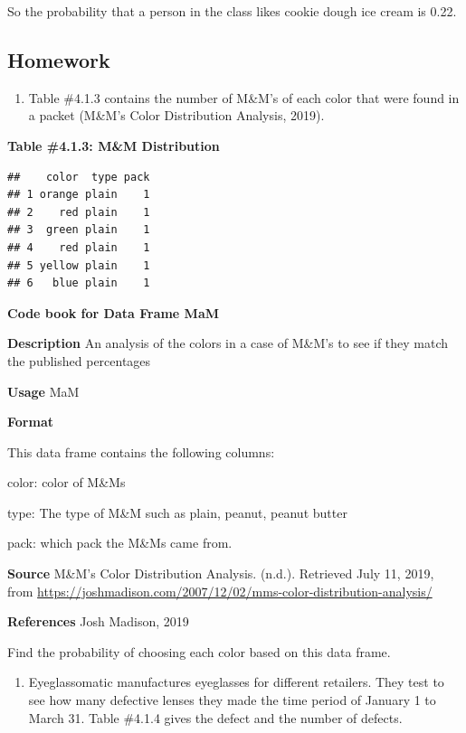 \documentclass[
]{book}
\providecommand{\tightlist}{%
  \setlength{\itemsep}{0pt}\setlength{\parskip}{0pt}}
\begin{document}
So the probability that a person in the class likes cookie dough ice cream is 0.22.

\hypertarget{homework-6}{%
\subsection{Homework}\label{homework-6}}

\begin{enumerate}
\def\labelenumi{\arabic{enumi}.}
\tightlist
\item
  Table \#4.1.3 contains the number of M\&M's of each color that were found in a packet (M\&M's Color Distribution Analysis, 2019).
\end{enumerate}

\textbf{Table \#4.1.3: M\&M Distribution}

\begin{verbatim}
##    color  type pack
## 1 orange plain    1
## 2    red plain    1
## 3  green plain    1
## 4    red plain    1
## 5 yellow plain    1
## 6   blue plain    1
\end{verbatim}

\textbf{Code book for Data Frame MaM}

\textbf{Description}
An analysis of the colors in a case of M\&M's to see if they match the published percentages

\textbf{Usage}
MaM

\textbf{Format}

This data frame contains the following columns:

color: color of M\&Ms

type: The type of M\&M such as plain, peanut, peanut butter

pack: which pack the M\&Ms came from.

\textbf{Source}
M\&M's Color Distribution Analysis. (n.d.). Retrieved July 11, 2019, from \url{https://joshmadison.com/2007/12/02/mms-color-distribution-analysis/}

\textbf{References}
Josh Madison, 2019

Find the probability of choosing each color based on this data frame.

\begin{enumerate}
\def\labelenumi{\arabic{enumi}.}
\setcounter{enumi}{1}
\tightlist
\item
  Eyeglassomatic manufactures eyeglasses for different retailers. They test to see how many defective lenses they made the time period of January 1 to March 31. Table \#4.1.4 gives the defect and the number
  of defects.
\end{enumerate}
\end{document}
